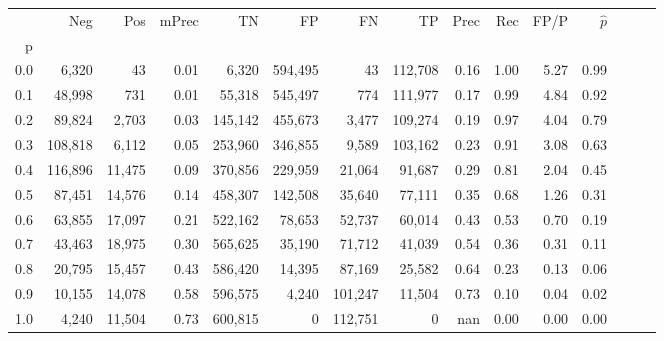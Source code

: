 \begin{tabular}{rrrrrrrrrrrrrrr}
\toprule
{} &      Neg &     Pos & mPrec &       TN &       FP &       FN &       TP &  Prec &   Rec &  FP/P & $\hat{p}$ \\
p   &          &         &       &          &          &          &          &       &       &       &           \\
\midrule
0.0 &    6,320 &      43 &  0.01 &    6,320 &  594,495 &       43 &  112,708 &  0.16 &  1.00 &  5.27 &      0.99 \\
0.1 &   48,998 &     731 &  0.01 &   55,318 &  545,497 &      774 &  111,977 &  0.17 &  0.99 &  4.84 &      0.92 \\
0.2 &   89,824 &   2,703 &  0.03 &  145,142 &  455,673 &    3,477 &  109,274 &  0.19 &  0.97 &  4.04 &      0.79 \\
0.3 &  108,818 &   6,112 &  0.05 &  253,960 &  346,855 &    9,589 &  103,162 &  0.23 &  0.91 &  3.08 &      0.63 \\
0.4 &  116,896 &  11,475 &  0.09 &  370,856 &  229,959 &   21,064 &   91,687 &  0.29 &  0.81 &  2.04 &      0.45 \\
0.5 &   87,451 &  14,576 &  0.14 &  458,307 &  142,508 &   35,640 &   77,111 &  0.35 &  0.68 &  1.26 &      0.31 \\
0.6 &   63,855 &  17,097 &  0.21 &  522,162 &   78,653 &   52,737 &   60,014 &  0.43 &  0.53 &  0.70 &      0.19 \\
0.7 &   43,463 &  18,975 &  0.30 &  565,625 &   35,190 &   71,712 &   41,039 &  0.54 &  0.36 &  0.31 &      0.11 \\
0.8 &   20,795 &  15,457 &  0.43 &  586,420 &   14,395 &   87,169 &   25,582 &  0.64 &  0.23 &  0.13 &      0.06 \\
0.9 &   10,155 &  14,078 &  0.58 &  596,575 &    4,240 &  101,247 &   11,504 &  0.73 &  0.10 &  0.04 &      0.02 \\
1.0 &    4,240 &  11,504 &  0.73 &  600,815 &        0 &  112,751 &        0 &   nan &  0.00 &  0.00 &      0.00 \\
\bottomrule
\end{tabular}
